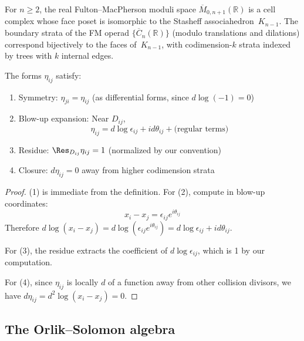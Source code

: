 \begin{theorem}\label{thm:fm-associahedron}
For $n \geq 2$, the real Fulton--MacPherson moduli space $\overline{M}_{0,n+1}(\mathbb{R})$ is a cell complex whose face poset is isomorphic to the Stasheff associahedron~$K_{n-1}$.  The boundary strata of the FM operad $\{\overline{C}_n(\mathbb{R})\}$ (modulo translations and dilations) correspond bijectively to the faces of~$K_{n-1}$, with codimension-$k$ strata indexed by trees with $k$ internal edges.
\end{theorem}

 
\begin{proposition}\label{prop:eta}
The forms $\eta_{ij}$ satisfy:
\begin{enumerate}
\item Symmetry: $\eta_{ji} = \eta_{ij}$ (as differential forms, since $d\log(-1) = 0$)
\item Blow-up expansion: Near $D_{ij}$,
\[
\eta_{ij} = d\log \epsilon_{ij} + id\theta_{ij} + \text{(regular terms)}
\]
\item Residue: $\Res_{D_{ij}} \eta_{ij} = 1$ (normalized by our convention)
\item Closure: $d\eta_{ij} = 0$ away from higher codimension strata
\end{enumerate}
\end{proposition}
 
\begin{proof}
(1) is immediate from the definition. For (2), compute in blow-up coordinates:
\[
x_i - x_j = \epsilon_{ij} e^{i\theta_{ij}}
\]
Therefore $d\log(x_i - x_j) = d\log(\epsilon_{ij} e^{i\theta_{ij}}) = d\log \epsilon_{ij} + id\theta_{ij}$.
 
For (3), the residue extracts the coefficient of $d\log \epsilon_{ij}$, which is 1 by our computation.
 
For (4), since $\eta_{ij}$ is locally $d$ of a function away from other collision divisors, we have $d\eta_{ij} = d^2\log(x_i - x_j) = 0$.
\end{proof}
 
\subsection{The Orlik--Solomon algebra}
 
